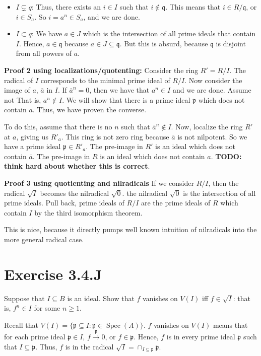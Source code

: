 \documentclass{book}
\newcommand{\Spec}{\operatorname{Spec}}
\newcommand{\p}{\mathfrak{p}}
\newcommand{\q}{\mathfrak{q}}
\newcommand{\rad}{\sqrt} %
\theoremstyle{definition}
\begin{document}
\begin{itemize}
\item $I \subsetneq q$: Thus, there exists an $i \in I$ such that $i \not \in \q$.
 This means that $i \in R/\q$, or $i \in S_a$. So $i = a^n \in S_a$, and we
 are done.

\item $I \subset q$: We have $a \in J$ which is the intersection of all prime ideals
that contain $I$. Hence, $a \in \q$  because $a \in J \subseteq \q$. But this
is absurd, because $\q$ is disjoint from all powers of $a$.
\end{itemize}

\textbf{Proof 2 using localizations/quotenting:} 
Consider the ring $R' = R/I$. The radical of $I$ corresponds to the 
minimal prime ideal of $R/I$. Now consider the image of $a$, $\overline{a}$
in $I$.  If $\overline{a}^n = 0$, then we have that $a^n \in I$ and we are done.
Assume not That is, $a^n \not \in I$. We will show that there is a prime
ideal $\p$ which does not contain $a$. Thus, we have proven the converse.

To do this, assume that there is no $n$ such that $\overline{a}^n \not \in I$.
Now, localize the ring $R'$ at $a$, giving us $R'_a$. This ring
is not zero ring because $\overline{a}$ is not nilpotent.
So we have a prime ideal $\p \in R'_a$. The pre-image in $R'$ is
an ideal which does not contain $\overline{a}$. The pre-image in $R$
is an ideal which does not contain $a$. 
\textbf{TODO: think hard about whether this is correct}.

\textbf{Proof 3 using quotienting and nilradicals}
If we consider $R/I$, then the radical $\rad{I}$ becomes the nilradical
$\rad{0}$. the nilradical $\rad{0}$ is the intersection of all prime ideals.
Pull back, prime ideals of $R/I$ are the prime ideals of $R$ which contain $I$
by the third isomorphism theorem.

This is nice, because it directly pumps well known intuition of nilradicals
into the more general radical case.


\section{Exercise 3.4.J}
Suppose that $I \subseteq B$ is an ideal. Show that $f$ vanishes on $V(I)$
iff $f \in \sqrt{I}$: that is, $f^n \in I$ for some $n \geq 1$.

Recall that $V(I) = \{ \p \subseteq I : \p \in \Spec(A) \}$.
$f$ vanishes on $V(I)$ means that for each prime ideal $\p \in I$,
$f \xrightarrow{\p} 0$, or $f \in \p$. Hence, $f$ is in every prime ideal
$\p$ such that $I \subseteq \p$. Thus, $f$ is in the radical
$\rad I = \cap_{I \subseteq \p} \p$.
\end{document}
